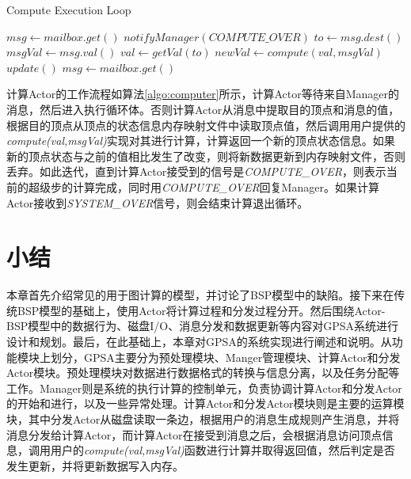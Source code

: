 \vspace{0.5em}
\begin{algorithm}
{
{
\renewcommand\baselinestretch{1.2}\selectfont %
\caption{Compute Execution Loop}
\label{algo:computer}
\begin{algorithmic}[1]

\STATE $msg \leftarrow mailbox.get()$
\STATE $notifyManager(COMPUTE\_OVER)$
\ELSE
\STATE $to \leftarrow msg.dest()$
\STATE $msgVal \leftarrow msg.val()$
\STATE $val \leftarrow getVal(to)$
\STATE $newVal \leftarrow compute(val,msgVal)$
	\STATE $update()$
\ENDIF
\ENDIF
\STATE $msg \leftarrow mailbox.get()$
\ENDWHILE


\end{algorithmic}
}
\par}
\end{algorithm}


计算Actor的工作流程如算法\ref{algo:computer}所示，计算Actor等待来自Manager的消息，然后进入执行循环体。否则计算Actor从消息中提取目的顶点和消息的值，根据目的顶点从顶点的状态信息内存映射文件中读取顶点值，然后调用用户提供的\textit{compute(val,msgVal)}实现对其进行计算，计算返回一个新的顶点状态信息。如果新的顶点状态与之前的值相比发生了改变，则将新数据更新到内存映射文件，否则丢弃。如此迭代，直到计算Actor接受到的信号是\textit{COMPUTE\_OVER}，则表示当前的超级步的计算完成，同时用\textit{COMPUTE\_OVER}回复Manager。如果计算Actor接收到\textit{SYSTEM\_OVER}信号，则会结束计算退出循环。




\section{小结}

本章首先介绍常见的用于图计算的模型，并讨论了BSP模型中的缺陷。接下来在传统BSP模型的基础上，使用Actor将计算过程和分发过程分开。然后围绕Actor-BSP模型中的数据行为、磁盘I/O、消息分发和数据更新等内容对GPSA系统进行设计和规划。最后，在此基础上，本章对GPSA的系统实现进行阐述和说明。从功能模块上划分，GPSA主要分为预处理模块、Manger管理模块、计算Actor和分发Actor模块。预处理模块对数据进行数据格式的转换与信息分离，以及任务分配等工作。Manager则是系统的执行计算的控制单元，负责协调计算Actor和分发Actor的开始和进行，以及一些异常处理。计算Actor和分发Actor模块则是主要的运算模块，其中分发Actor从磁盘读取一条边，根据用户的消息生成规则产生消息，并将消息分发给计算Actor，而计算Actor在接受到消息之后，会根据消息访问顶点信息，调用用户的\textit{compute(val,msgVal)}函数进行计算并取得返回值，然后判定是否发生更新，并将更新数据写入内存。
